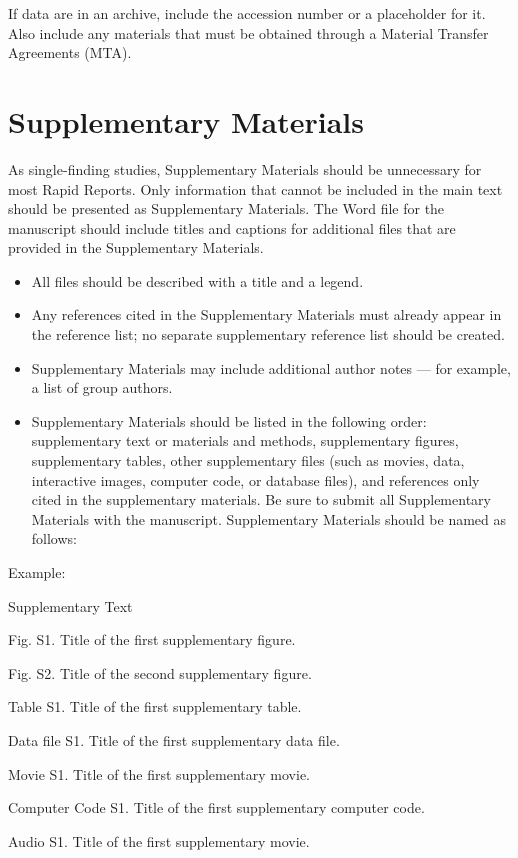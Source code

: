 \documentclass{article}
\begin{document}
If data are in an archive, include the accession number or a placeholder for it. Also include any materials that must be obtained through a Material Transfer Agreements (MTA). 

\section*{Supplementary Materials}
As single-finding studies, Supplementary Materials should be unnecessary for most Rapid Reports. Only information that cannot be included in the main text should be presented as Supplementary Materials. The Word file for the manuscript should include titles and captions for additional files that are provided in the Supplementary Materials. 
\begin{itemize}
    \item All files should be described with a title and a legend.
    \item Any references cited in the Supplementary Materials must already appear in the reference list; no separate supplementary reference list should be created.
    \item Supplementary Materials may include additional author notes — for example, a list of group authors.
    \item Supplementary Materials should be listed in the following order: supplementary text or materials and methods, supplementary figures, supplementary tables, other supplementary files (such as movies, data, interactive images, computer code, or database files), and references only cited in the supplementary materials. Be sure to submit all Supplementary Materials with the manuscript. Supplementary Materials should be named as follows:
    \end{itemize}
\medskip Example:

Supplementary Text

Fig. S1. Title of the first supplementary figure.

Fig. S2. Title of the second supplementary figure.

Table S1. Title of the first supplementary table.

Data file S1. Title of the first supplementary data file.

Movie S1. Title of the first supplementary movie.

Computer Code S1. Title of the first supplementary computer code.

Audio S1. Title of the first supplementary movie.
\end{document}
